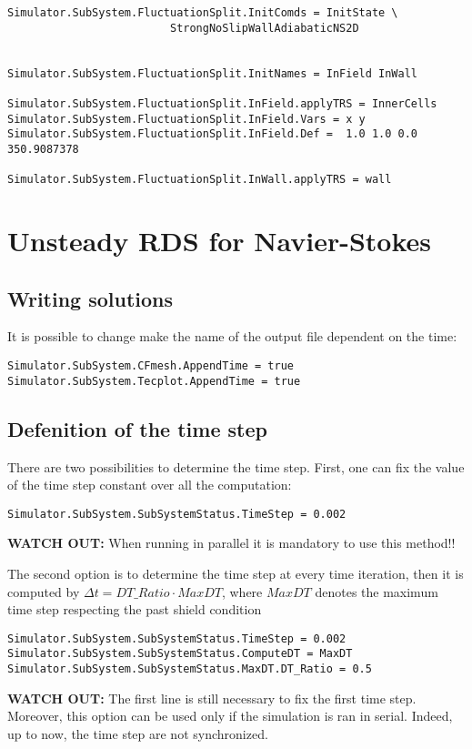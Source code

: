 \documentclass[11pt]{article}
\begin{document}
\begin{verbatim}
Simulator.SubSystem.FluctuationSplit.InitComds = InitState \
 						 StrongNoSlipWallAdiabaticNS2D 


Simulator.SubSystem.FluctuationSplit.InitNames = InField InWall

Simulator.SubSystem.FluctuationSplit.InField.applyTRS = InnerCells
Simulator.SubSystem.FluctuationSplit.InField.Vars = x y
Simulator.SubSystem.FluctuationSplit.InField.Def =  1.0 1.0 0.0 350.9087378

Simulator.SubSystem.FluctuationSplit.InWall.applyTRS = wall
\end{verbatim}

\section{Unsteady RDS for Navier-Stokes}

\subsection{Writing solutions}
It is possible to change make the name of the output file dependent on the time:
\begin{verbatim}
Simulator.SubSystem.CFmesh.AppendTime = true
Simulator.SubSystem.Tecplot.AppendTime = true
\end{verbatim}

\subsection{Defenition of the time step}
There are two possibilities to determine the time step.
First, one can fix the value of the time step constant 
over all the computation:

\begin{verbatim}
Simulator.SubSystem.SubSystemStatus.TimeStep = 0.002
\end{verbatim}
{\bf WATCH OUT:} When running in parallel it is mandatory to use this method!!

The second option is to determine the time step at every time iteration,
then it is computed by $\Delta t= DT \_ Ratio \cdot MaxDT$, where $MaxDT$
denotes the maximum time step respecting the past shield condition \cite{mr-thesis}

\begin{verbatim}
Simulator.SubSystem.SubSystemStatus.TimeStep = 0.002
Simulator.SubSystem.SubSystemStatus.ComputeDT = MaxDT
Simulator.SubSystem.SubSystemStatus.MaxDT.DT_Ratio = 0.5
\end{verbatim}
{\bf WATCH OUT:} The first line is still necessary to fix the first time step. Moreover, this option can be used
only if the simulation is ran in serial. Indeed, up to now, the time step are not synchronized.
\end{document}
